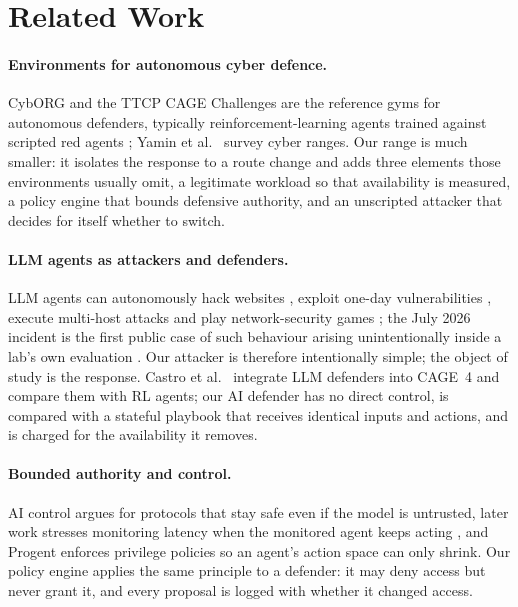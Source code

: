 \documentclass[10pt,a4paper]{article}
\begin{document}
\section{Related Work}\label{sec:related}

\paragraph{Environments for autonomous cyber defence.}
CybORG \citep{standen2021cyborg} and the TTCP CAGE Challenges \citep{kiely2023autonomous,kiely2025cage4} are the reference gyms for autonomous defenders, typically reinforcement-learning agents trained against scripted red agents \citep{vyas2023automated}; Yamin et al.\ \citep{yamin2020cyber} survey cyber ranges. Our range is much smaller: it isolates the response to a route change and adds three elements those environments usually omit, a legitimate workload so that availability is measured, a policy engine that bounds defensive authority, and an unscripted attacker that decides for itself whether to switch.

\paragraph{LLM agents as attackers and defenders.}
LLM agents can autonomously hack websites \citep{fang2024websites}, exploit one-day vulnerabilities \citep{fang2024oneday}, execute multi-host attacks \citep{singer2025incalmo} and play network-security games \citep{rigaki2024cage}; the July 2026 incident is the first public case of such behaviour arising unintentionally inside a lab's own evaluation \citep{openai2026road}. Our attacker is therefore intentionally simple; the object of study is the response. Castro et al.\ \citep{castro2025llmdefenders} integrate LLM defenders into CAGE~4 and compare them with RL agents; our AI defender has no direct control, is compared with a stateful playbook that receives identical inputs and actions, and is charged for the availability it removes.

\paragraph{Bounded authority and control.}
AI control \citep{greenblatt2024control} argues for protocols that stay safe even if the model is untrusted, later work stresses monitoring latency when the monitored agent keeps acting \citep{stickland2025async}, and Progent \citep{shi2025progent} enforces privilege policies so an agent's action space can only shrink. Our policy engine applies the same principle to a defender: it may deny access but never grant it, and every proposal is logged with whether it changed access.
\end{document}

